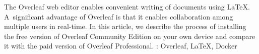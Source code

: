 \documentclass{csbulletin}
\begin{document}
\printbibliography  

\begin{summary}
The Overleaf web editor enables convenient writing of documents using \LaTeX. A~significant advantage of Overleaf is that it enables collaboration among multiple users in real-time. In this article, we describe the process of installing the free version of Overleaf Community Edition on your own device and compare it with the paid version of Overleaf Professional.
\keywords: Overleaf, \LaTeX, Docker
\end{summary}
\end{document}
